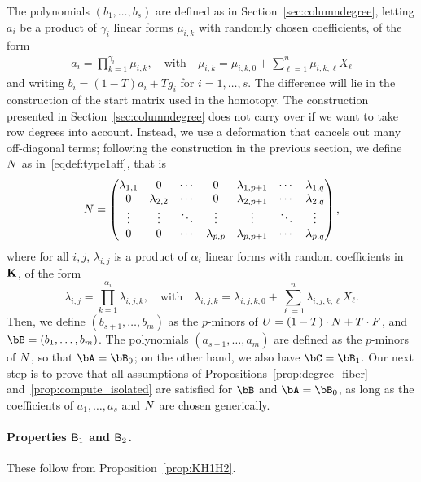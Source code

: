 \documentclass[12pt]{article}
\begin{document}
The polynomials $(b_1,\dots,b_s)$ are defined as in Section~\ref{sec:columndegree}, letting $a_i$ be a product of $\gamma_i$ linear forms
$\mu_{i,k}$ with randomly chosen coefficients, of the form
\begin{align}\label{eqdef:ai}
a_i=\prod_{k=1}^{\gamma_i} \mu_{i,k},\quad\text{with}\quad
\mu_{i,k}=\mu_{i,k,0} + \sum_{\ell=1}^n \mu_{i,k,\ell}X_\ell
\end{align}
and writing $b_i=(1-T)a_i + T g_i$ for $i=1,\dots,s$. The difference
will lie in the construction of the start matrix used in the homotopy. The
construction  presented in
Section~\ref{sec:columndegree} does not carry over if we want to take
row degrees into account. Instead, we use a deformation that cancels
out many off-diagonal terms; following the construction in the
previous section, we define ${N}$ as in~\eqref{eqdef:type1aff}, that is
\begin{align*}
{N} = \left( \begin{matrix}
\lambda_{1,1} & 0 & \cdots & 0 & \lambda_{1,p+1} & \cdots & \lambda_{1, q}\\
0 & \lambda_{2,2} & \cdots & 0 & \lambda_{2,p+1} & \cdots & \lambda_{2, q}\\
\vdots & \vdots & \ddots & \vdots & \vdots & \ddots & \vdots\\
0 & 0 & \cdots & \lambda_{p,p} & \lambda_{p,p+1} & \cdots & \lambda_{p, q}
\end{matrix} \right), 
\end{align*} 
where for all $i,j$, $\lambda_{i,j}$ is a product of $\alpha_i$ linear forms with random
coefficients in $\mathbf{K}$, of the form
$$\lambda_{i,j}= \prod_{k=1}^{\alpha_i}\lambda_{i,j,k},
\quad\text{with}\quad
\lambda_{i,j,k} =\lambda_{i,j,k,0} + \sum_{\ell=1}^n \lambda_{i,j,k,\ell}X_\ell.
$$ Then, we define $(b_{s+1},\dots,b_m)$ as the
$p$-minors of ${U}=(1-T)\cdot{N} + T\cdot {F}$, and $\bB=(b_1,\dots,b_m)$.
The polynomials $(a_{s+1},\dots,a_m)$ are defined as the $p$-minors of
${N}$, so that $\bA=\bB_0$; on the other hand, we also have
$\bC=\bB_1$.  Our next step is to prove that all assumptions of
Propositions~\ref{prop:degree_fiber} and~\ref{prop:compute_isolated}
are satisfied for $\bB$ and $\bA=\bB_0$, as long as the coefficients 
of $a_1,\dots,a_s$ and ${N}$ are chosen generically.

\paragraph{Properties $\mathsf{B}_1$ and $\mathsf{B}_2$.}
These follow from Proposition~\ref{prop:KH1H2}.
\end{document}
